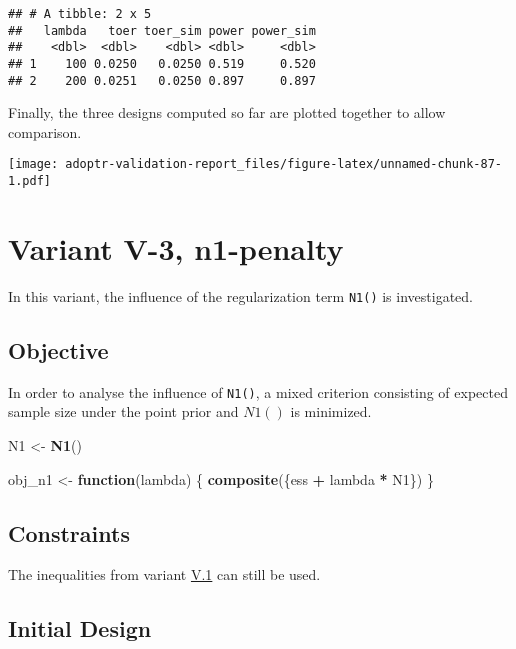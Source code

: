 \documentclass[]{book}
\newenvironment{Shaded}{\begin{snugshade}}{\end{snugshade}}
\newcommand{\ControlFlowTok}[1]{\textcolor[rgb]{0.13,0.29,0.53}{\textbf{#1}}}
\newcommand{\KeywordTok}[1]{\textcolor[rgb]{0.13,0.29,0.53}{\textbf{#1}}}
\newcommand{\NormalTok}[1]{#1}
\newcommand{\OperatorTok}[1]{\textcolor[rgb]{0.81,0.36,0.00}{\textbf{#1}}}
\newcommand{\StringTok}[1]{\textcolor[rgb]{0.31,0.60,0.02}{#1}}
\begin{document}
\begin{verbatim}
## # A tibble: 2 x 5
##   lambda   toer toer_sim power power_sim
##    <dbl>  <dbl>    <dbl> <dbl>     <dbl>
## 1    100 0.0250   0.0250 0.519     0.520
## 2    200 0.0251   0.0250 0.897     0.897
\end{verbatim}

Finally, the three designs computed so far are plotted together to allow
comparison.

\texttt{[image: adoptr-validation-report\_files/figure-latex/unnamed-chunk-87-1.pdf]}

\hypertarget{variantV_3}{%
\section{Variant V-3, n1-penalty}\label{variantV_3}}

In this variant, the influence of the regularization term \texttt{N1()} is investigated.

\hypertarget{objective-12}{%
\subsection{Objective}\label{objective-12}}

In order to analyse the influence of \texttt{N1()},
a mixed criterion consisting of expected sample size under the point prior
and \(N1()\) is minimized.

\begin{Shaded}
\begin{Highlighting}[]
\NormalTok{N1 <-}\StringTok{ }\KeywordTok{N1}\NormalTok{()}

\NormalTok{obj_n1 <-}\StringTok{ }\ControlFlowTok{function}\NormalTok{(lambda) \{}
  \KeywordTok{composite}\NormalTok{(\{ess }\OperatorTok{+}\StringTok{ }\NormalTok{lambda }\OperatorTok{*}\StringTok{ }\NormalTok{N1\})}
\NormalTok{\}}
\end{Highlighting}
\end{Shaded}

\hypertarget{constraints-12}{%
\subsection{Constraints}\label{constraints-12}}

The inequalities from variant \protect\hyperlink{variantV_1}{V.1} can still be used.

\hypertarget{initial-design-10}{%
\subsection{Initial Design}\label{initial-design-10}}
\end{document}
